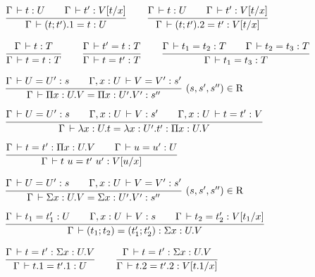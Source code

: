 \documentclass[a4paper,english]{lipics-utf8x}
\begin{document}
\begin{center}
\(
  \ru{\Gamma \der t : U \qquad
      \Gamma \der t' : V[t/x]
    }{\Gamma \der (t;t').1 = t : U}
  \qquad
  \ru{\Gamma \der t : U \qquad
      \Gamma \der t' : V[t/x]
    }{\Gamma \der (t;t').2 = t' : V[t/x]}
\)
\end{center}


\begin{center}
\(
  \ru{\Gamma \der t : T
    }{\Gamma \der t = t : T}
  \qquad
  \ru{\Gamma \der t' = t : T
    }{\Gamma \der t = t' : T}
  \qquad
  \ru{\Gamma \der t_1 = t_2 : T \qquad
      \Gamma \der t_2 = t_3 : T
    }{\Gamma \der t_1 = t_3 : T}
\)
\end{center}


\begin{center}
\(
  \rux{\Gamma \der U = U' : s \qquad
       \Gamma, x:U \der V = V' : s'
     }{\Gamma \der \Pi x:U.V = \Pi x:U'.V' : s''
     }{(s,s',s'') \in \R}
\)
\end{center}

\begin{center}
\(
  \ru{\Gamma \der U = U' : s \qquad
      \Gamma, x:U \der V : s' \qquad
      \Gamma, x:U \der t = t' : V
    }{\Gamma \der \lambda x:U.t = \lambda x:U'.t' : \Pi x:U.V}
\)
\end{center}

\begin{center}
\(
  \ru{\Gamma \der t = t' : \Pi x:U.V \qquad
      \Gamma \der u = u' : U
    }{\Gamma \der t~u = t'~u' : V[u/x]}
\)
\end{center}

\begin{center}
\(
  \rux{\Gamma \der U = U' : s \qquad
       \Gamma, x:U \der V = V' : s'
     }{\Gamma \der \Sigma x:U.V = \Sigma x:U'.V' : s''
     }{(s,s',s'') \in \R}
\)
\end{center}

\begin{center}
\(
  \ru{\Gamma \der t_1 = t'_1 : U \qquad
      \Gamma, x:U \der V : s \qquad
      \Gamma \der t_2 = t'_2 : V[t_1/x]
    }{\Gamma \der (t_1;t_2) = (t'_1;t'_2) : \Sigma x:U.V}
\)
\end{center}

\begin{center}
\(
  \ru{\Gamma \der t = t' : \Sigma x:U.V
    }{\Gamma \der t.1 = t'.1 : U}
  \qquad
  \ru{\Gamma \der t = t' : \Sigma x:U.V
    }{\Gamma \der t.2 = t'.2 : V[t.1/x]}
\)
\end{center}
\end{document}
